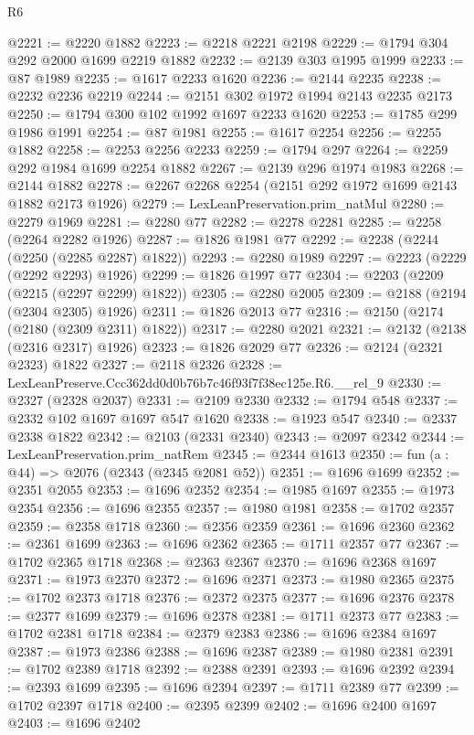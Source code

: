 \begin{lexlean}{R6}
\begin{coremodule}
@2221 := @2220 @1882
@2223 := @2218 @2221 @2198
@2229 := @1794 @304 @292 @2000 @1699 @2219 @1882
@2232 := @2139 @303 @1995 @1999
@2233 := @87 @1989
@2235 := @1617 @2233 @1620
@2236 := @2144 @2235
@2238 := @2232 @2236 @2219
@2244 := @2151 @302 @1972 @1994 @2143 @2235 @2173
@2250 := @1794 @300 @102 @1992 @1697 @2233 @1620
@2253 := @1785 @299 @1986 @1991
@2254 := @87 @1981
@2255 := @1617 @2254
@2256 := @2255 @1882
@2258 := @2253 @2256 @2233
@2259 := @1794 @297
@2264 := @2259 @292 @1984 @1699 @2254 @1882
@2267 := @2139 @296 @1974 @1983
@2268 := @2144 @1882
@2278 := @2267 @2268 @2254 (@2151 @292 @1972 @1699 @2143 @1882 @2173 @1926)
@2279 := LexLeanPreservation.prim_natMul
@2280 := @2279 @1969
@2281 := @2280 @77
@2282 := @2278 @2281
@2285 := @2258 (@2264 @2282 @1926)
@2287 := @1826 @1981 @77
@2292 := @2238 (@2244 (@2250 (@2285 @2287) @1822))
@2293 := @2280 @1989
@2297 := @2223 (@2229 (@2292 @2293) @1926)
@2299 := @1826 @1997 @77
@2304 := @2203 (@2209 (@2215 (@2297 @2299) @1822))
@2305 := @2280 @2005
@2309 := @2188 (@2194 (@2304 @2305) @1926)
@2311 := @1826 @2013 @77
@2316 := @2150 (@2174 (@2180 (@2309 @2311) @1822))
@2317 := @2280 @2021
@2321 := @2132 (@2138 (@2316 @2317) @1926)
@2323 := @1826 @2029 @77
@2326 := @2124 (@2321 @2323) @1822
@2327 := @2118 @2326
@2328 := LexLeanPreserve.Ccc362dd0d0b76b7c46f93f7f38ec125e.R6.__rel_9
@2330 := @2327 (@2328 @2037)
@2331 := @2109 @2330
@2332 := @1794 @548
@2337 := @2332 @102 @1697 @1697 @547 @1620
@2338 := @1923 @547
@2340 := @2337 @2338 @1822
@2342 := @2103 (@2331 @2340)
@2343 := @2097 @2342
@2344 := LexLeanPreservation.prim_natRem
@2345 := @2344 @1613
@2350 := fun (a : @44) => @2076 (@2343 (@2345 @2081 @52))
@2351 := @1696 @1699
@2352 := @2351 @2055
@2353 := @1696 @2352
@2354 := @1985 @1697
@2355 := @1973 @2354
@2356 := @1696 @2355
@2357 := @1980 @1981
@2358 := @1702 @2357
@2359 := @2358 @1718
@2360 := @2356 @2359
@2361 := @1696 @2360
@2362 := @2361 @1699
@2363 := @1696 @2362
@2365 := @1711 @2357 @77
@2367 := @1702 @2365 @1718
@2368 := @2363 @2367
@2370 := @1696 @2368 @1697
@2371 := @1973 @2370
@2372 := @1696 @2371
@2373 := @1980 @2365
@2375 := @1702 @2373 @1718
@2376 := @2372 @2375
@2377 := @1696 @2376
@2378 := @2377 @1699
@2379 := @1696 @2378
@2381 := @1711 @2373 @77
@2383 := @1702 @2381 @1718
@2384 := @2379 @2383
@2386 := @1696 @2384 @1697
@2387 := @1973 @2386
@2388 := @1696 @2387
@2389 := @1980 @2381
@2391 := @1702 @2389 @1718
@2392 := @2388 @2391
@2393 := @1696 @2392
@2394 := @2393 @1699
@2395 := @1696 @2394
@2397 := @1711 @2389 @77
@2399 := @1702 @2397 @1718
@2400 := @2395 @2399
@2402 := @1696 @2400 @1697
@2403 := @1696 @2402

\end{coremodule}
\end{lexlean}
